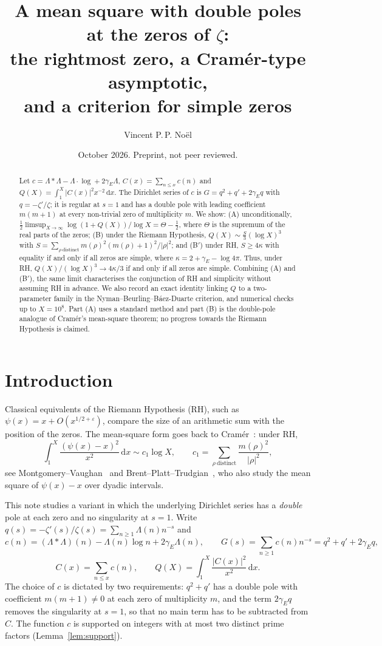 \documentclass[11pt]{amsart}
\title[A double-pole mean square and simple zeros]{A mean square with double poles at the zeros of $\zeta$: \\ the rightmost zero, a Cram\'er-type asymptotic, \\ and a criterion for simple zeros}
\author{Vincent P.\,P. No\"el}
\date{October 2026. Preprint, not peer reviewed.}
\theoremstyle{remark}
\theoremstyle{definition}
\newcommand{\Lam}{\Lambda}
\newcommand{\gE}{\gamma_E}
\newcommand{\dd}{\,\mathrm{d}}
\begin{document}
\begin{abstract}
Let $c=\Lam*\Lam-\Lam\cdot\log+2\gE\Lam$, $C(x)=\sum_{n\le x}c(n)$ and $Q(X)=\int_1^X|C(x)|^2x^{-2}\dd x$. The Dirichlet series of $c$ is $G=q^2+q'+2\gE q$ with $q=-\zeta'/\zeta$; it is regular at $s=1$ and has a double pole with leading coefficient $m(m+1)$ at every non-trivial zero of multiplicity $m$. We show: (A) unconditionally, $\tfrac12\limsup_{X\to\infty}\log(1+Q(X))/\log X=\Theta-\tfrac12$, where $\Theta$ is the supremum of the real parts of the zeros; (B) under the Riemann Hypothesis, $Q(X)\sim\tfrac{S}{3}(\log X)^3$ with $S=\sum_{\rho\ \mathrm{distinct}}m(\rho)^2(m(\rho)+1)^2/|\rho|^2$; and (B$'$) under RH, $S\ge 4\kappa$ with equality if and only if all zeros are simple, where $\kappa=2+\gE-\log 4\pi$. Thus, under RH, $Q(X)/(\log X)^3\to 4\kappa/3$ if and only if all zeros are simple. Combining (A) and (B$'$), the same limit characterises the conjunction of RH and simplicity without assuming RH in advance. We also record an exact identity linking $Q$ to a two-parameter family in the Nyman--Beurling--B\'aez-Duarte criterion, and numerical checks up to $X=10^8$. Part (A) uses a standard method and part (B) is the double-pole analogue of Cram\'er's mean-square theorem; no progress towards the Riemann Hypothesis is claimed.
\end{abstract}

\maketitle

\section{Introduction}

Classical equivalents of the Riemann Hypothesis (RH), such as $\psi(x)=x+O(x^{1/2+\varepsilon})$, compare the size of an arithmetic sum with the position of the zeros. The mean-square form goes back to Cram\'er~\cite{Cra22}: under RH,
\begin{equation}\label{eq:cramer}
\int_1^X\frac{(\psi(x)-x)^2}{x^2}\dd x\sim c_1\log X,\qquad c_1=\sum_{\rho\ \mathrm{distinct}}\frac{m(\rho)^2}{|\rho|^2},
\end{equation}
see Montgomery--Vaughan~\cite[Thm.~13.6]{MV07} and Brent--Platt--Trudgian~\cite[eq.~(18)]{BPT22}, who also study the mean square of $\psi(x)-x$ over dyadic intervals.

This note studies a variant in which the underlying Dirichlet series has a \emph{double} pole at each zero and no singularity at $s=1$. Write $q(s)=-\zeta'(s)/\zeta(s)=\sum_{n\ge1}\Lam(n)n^{-s}$ and
\[
c(n)=(\Lam*\Lam)(n)-\Lam(n)\log n+2\gE\Lam(n),\qquad G(s)=\sum_{n\ge1}c(n)n^{-s}=q^2+q'+2\gE q,
\]
\[
C(x)=\sum_{n\le x}c(n),\qquad Q(X)=\int_1^X\frac{|C(x)|^2}{x^2}\dd x .
\]
The choice of $c$ is dictated by two requirements: $q^2+q'$ has a double pole with coefficient $m(m+1)\neq0$ at each zero of multiplicity $m$, and the term $2\gE q$ removes the singularity at $s=1$, so that no main term has to be subtracted from $C$. The function $c$ is supported on integers with at most two distinct prime factors (Lemma~\ref{lem:support}).
\end{document}
